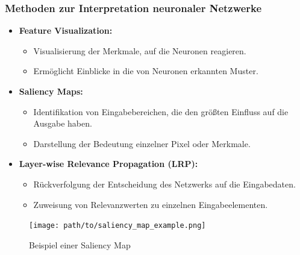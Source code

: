 \documentclass[aspectratio=1610, xcolor=dvipsnames, 9pt]{beamer}
\begin{document}
\begin{frame}
  \frametitle{Methoden zur Interpretation neuronaler Netzwerke}
  \begin{itemize}
      \item \textbf{Feature Visualization:}
      \begin{itemize}
          \item Visualisierung der Merkmale, auf die Neuronen reagieren.
          \item Ermöglicht Einblicke in die von Neuronen erkannten Muster.
      \end{itemize}
      \item \textbf{Saliency Maps:}
      \begin{itemize}
          \item Identifikation von Eingabebereichen, die den größten Einfluss auf die Ausgabe haben.
          \item Darstellung der Bedeutung einzelner Pixel oder Merkmale.
      \end{itemize}
      \item \textbf{Layer-wise Relevance Propagation (LRP):}
      \begin{itemize}
          \item Rückverfolgung der Entscheidung des Netzwerks auf die Eingabedaten.
          \item Zuweisung von Relevanzwerten zu einzelnen Eingabeelementen.
      \end{itemize}
  \end{itemize}
  \begin{figure}
      \centering
      \texttt{[image: path/to/saliency\_map\_example.png]}
      \caption{Beispiel einer Saliency Map}
  \end{figure}
\end{frame}
\end{document}
